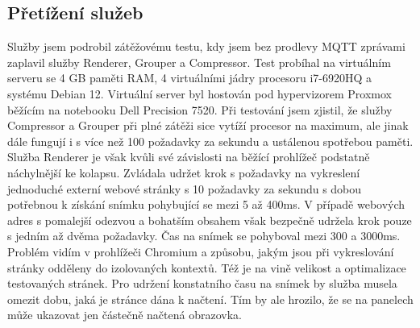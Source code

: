 \subsection{Přetížení služeb}
Služby jsem podrobil zátěžovému testu, kdy jsem bez prodlevy MQTT zprávami zaplavil služby Renderer, Grouper a Compressor. Test probíhal na virtuálním serveru se 4 GB paměti RAM, 4 virtuálními jádry procesoru i7-6920HQ a systému Debian 12. Virtuální server byl hostován pod hypervizorem Proxmox běžícím na notebooku Dell Precision 7520. Při testování jsem zjistil, že služby Compressor a Grouper při plné zátěži sice vytíží procesor na maximum, ale jinak dále fungují i s více než 100 požadavky za sekundu a ustálenou spotřebou paměti. Služba Renderer je však kvůli své závislosti na běžící prohlížeč podstatně náchylnější ke kolapsu. Zvládala udržet krok s požadavky na vykreslení jednoduché externí webové stránky s 10 požadavky za sekundu s dobou potřebnou k získání snímku pohybující se mezi 5 až 400ms. V případě webových adres s pomalejší odezvou a bohatším obsahem však bezpečně udržela krok pouze s jedním až dvěma požadavky. Čas na snímek se pohyboval mezi 300 a 3000ms. Problém vidím v prohlížeči Chromium a způsobu, jakým jsou při vykreslování stránky odděleny do izolovaných kontextů. Též je na vině velikost a optimalizace testovaných stránek. Pro udržení konstatního času na snímek by služba musela omezit dobu, jaká je stránce dána k načtení. Tím by ale hrozilo, že se na panelech může ukazovat jen částečně načtená obrazovka.
